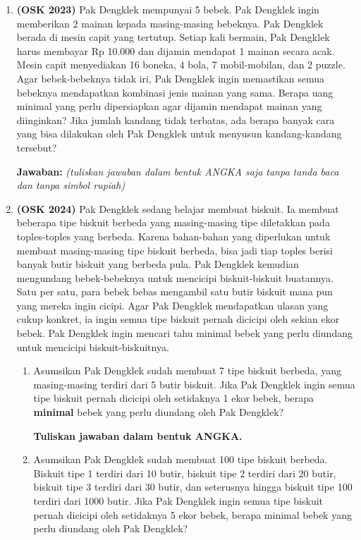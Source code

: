\documentclass[a4paper]{article}
\begin{document}
\begin{enumerate}
    \item\textbf{(OSK 2023)} Pak Dengklek mempunyai 5 bebek. Pak Dengklek ingin memberikan 2 mainan kepada masing-masing bebeknya. Pak Dengklek berada di mesin capit yang tertutup. Setiap kali bermain, Pak Dengklek harus membayar Rp 10.000 dan dijamin mendapat 1 mainan secara acak. Mesin capit menyediakan 16 boneka, 4 bola, 7 mobil-mobilan, dan 2 puzzle. 
    Agar bebek-bebeknya tidak iri, Pak Dengklek ingin memastikan semua bebeknya mendapatkan kombinasi jenis mainan yang sama. Berapa uang minimal yang perlu dipersiapkan agar dijamin mendapat mainan yang diinginkan?
    Jika jumlah kandang tidak terbatas, ada berapa banyak cara yang bisa dilakukan oleh Pak Dengklek untuk menyusun kandang-kandang tersebut?
    
    \textbf{Jawaban:} \dotfill \emph{(tuliskan jawaban dalam bentuk ANGKA saja tanpa tanda baca dan tanpa simbol rupiah)}
    

    \item\textbf{(OSK 2024)} Pak Dengklek sedang belajar membuat biskuit. Ia membuat beberapa tipe biskuit berbeda yang masing-masing tipe diletakkan pada toples-toples yang berbeda. Karena bahan-bahan yang diperlukan untuk membuat masing-masing tipe biskuit berbeda, bisa jadi tiap toples berisi banyak butir biskuit yang berbeda pula. Pak Dengklek kemudian mengundang bebek-bebeknya untuk mencicipi biskuit-biskuit buatannya. Satu per satu, para bebek bebas mengambil satu butir biskuit mana pun yang mereka ingin cicipi. Agar Pak Dengklek mendapatkan ulasan yang cukup konkret, ia ingin semua tipe biskuit pernah dicicipi oleh sekian ekor bebek. Pak Dengklek ingin mencari tahu minimal bebek yang perlu diundang untuk mencicipi biskuit-biskuitnya.
    \begin{enumerate}
      \item Asumsikan Pak Dengklek sudah membuat 7 tipe biskuit berbeda, yang masing-masing terdiri dari 5 butir biskuit. Jika Pak Dengklek ingin semua tipe biskuit pernah dicicipi oleh setidaknya 1 ekor bebek, berapa \textbf{minimal} bebek yang perlu diundang oleh Pak Dengklek?
      
      \textbf{Tuliskan jawaban dalam bentuk ANGKA.}

      \item Asumsikan Pak Dengklek sudah membuat 100 tipe biskuit berbeda. Biskuit tipe 1 terdiri dari 10 butir, biskuit tipe 2 terdiri dari 20 butir, biskuit tipe 3 terdiri dari 30 butir, dan seterusnya hingga biskuit tipe 100 terdiri dari 1000 butir. Jika Pak Dengklek ingin semua tipe biskuit pernah dicicipi oleh setidaknya 5 ekor bebek, berapa minimal bebek yang perlu diundang oleh Pak Dengklek?
      

\end{enumerate}
\end{enumerate}
\end{document}
